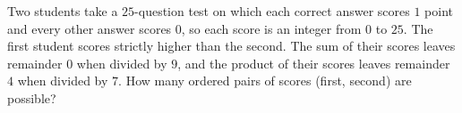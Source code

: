 Two students take a $25$-question test on which each correct answer scores $1$ point and every other answer scores $0$, so each score is an integer from $0$ to $25$. The first student scores strictly higher than the second. The sum of their scores leaves remainder $0$ when divided by $9$, and the product of their scores leaves remainder $4$ when divided by $7$. How many ordered pairs of scores (first, second) are possible?
